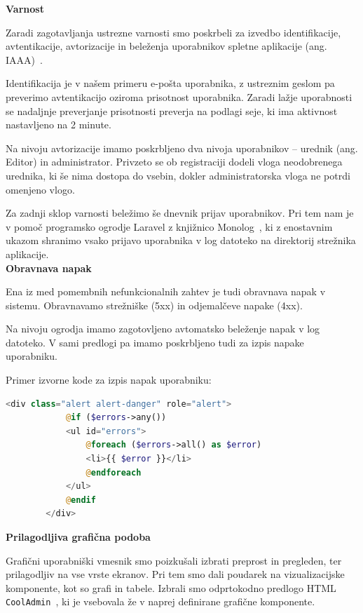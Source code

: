 \documentclass[a4paper, 12pt]{book}
\begin{document}
\noindent \textbf{Varnost}

Zaradi zagotavljanja ustrezne varnosti smo poskrbeli za izvedbo identifikacije, avtentikacije, avtorizacije in beleženja uporabnikov spletne aplikacije (ang. IAAA)~\cite{IAAA-security}.

Identifikacija je v našem primeru e-pošta uporabnika, z ustreznim geslom pa preverimo avtentikacijo oziroma prisotnost uporabnika. Zaradi lažje uporabnosti se nadaljnje preverjanje prisotnosti preverja na podlagi seje, ki ima aktivnost nastavljeno na 2 minute. 

Na nivoju avtorizacije imamo poskrbljeno dva nivoja uporabnikov – urednik (ang. Editor) in administrator. Privzeto se ob registraciji dodeli vloga neodobrenega urednika, ki še nima dostopa do vsebin, dokler administratorska vloga ne potrdi omenjeno vlogo.

Za zadnji sklop varnosti beležimo še dnevnik prijav uporabnikov. Pri tem nam je v pomoč programsko ogrodje Laravel z knjižnico Monolog~\cite{laravel-monolog}, ki z enostavnim ukazom shranimo vsako prijavo uporabnika v log datoteko na direktorij strežnika aplikacije. \\

\noindent \textbf{Obravnava napak}

Ena iz med pomembnih nefunkcionalnih zahtev je tudi obravnava napak v sistemu. Obravnavamo strežniške (5xx) in odjemalčeve napake (4xx). 


Na nivoju ogrodja imamo zagotovljeno avtomatsko beleženje napak v log datoteko. V sami predlogi pa imamo poskrbljeno tudi za izpis napake uporabniku.

Primer izvorne kode za izpis napak uporabniku:

\begin{lstlisting}[language=PHP, style=mystyle]
        <div class="alert alert-danger" role="alert">
            @if ($errors->any())
            <ul id="errors">
                @foreach ($errors->all() as $error)
                <li>{{ $error }}</li>
                @endforeach
            </ul>
            @endif
        </div>
\end{lstlisting}

\vspace{5mm}

\noindent \textbf{Prilagodljiva grafična podoba}

Grafični uporabniški vmesnik smo poizkušali izbrati preprost in pregleden, ter prilagodljiv na vse vrste ekranov. Pri tem smo dali poudarek na vizualizacijske komponente, kot so grafi in tabele. Izbrali smo odprtokodno predlogo HTML {\tt CoolAdmin}~\cite{cooladmin-html-template}, ki je vsebovala že v naprej definirane grafične komponente.
\end{document}
